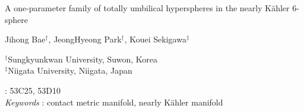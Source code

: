 \documentclass[12pt]{article}
\numberwithin{equation}{section}
\begin{document}
%
%

\begin{center}
{\LARGE {{A one-parameter family of totally umbilical hyperspheres
in the nearly {K\"ahler} $6$-sphere}}}
\end{center}
{
\begin{center}
{\large Jihong Bae$^{\dag}$, JeongHyeong Park$^{\dag}$, Kouei
Sekigawa$^{\ddag}$}
\end{center} }
\begin{center}
$^{\dag}$Sungkyunkwan University,
 Suwon, Korea\\
$^{\ddag}$Niigata University,
    Niigata, Japan\end{center}


\begin{abstract}
{{We discuss two kinds of almost contact metric structures on a
one-parameter family of totally umbilical hyperspheres in the nearly
{K\"ahler} unit $6$-sphere $S^{6}$.}}
\end{abstract}
 : 53C25, 53D10\\
{\it Keywords} : contact metric manifold, nearly K\"ahler 
manifold




\end{document}
